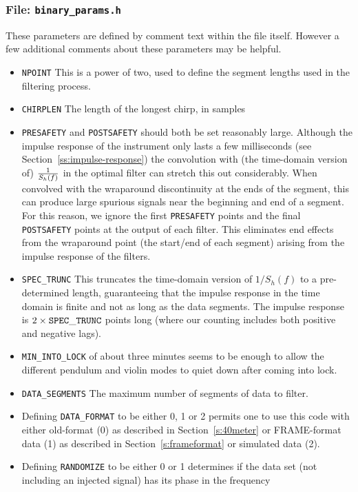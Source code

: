 \subsubsection{File: \texttt{binary\_params.h}}
These parameters are defined by comment text within the file itself.
However a few additional comments about these parameters may be helpful.
\begin{itemize}
\item
{\tt NPOINT}
This is a power of two, used to define the segment lengths used in the
filtering process.
\item
{\tt CHIRPLEN}
The length of the longest chirp, in samples
\item 
{\tt PRESAFETY} and {\tt POSTSAFETY} should both be set reasonably
large.  Although the impulse response of the instrument only lasts a few
milliseconds (see Section~\ref{ss:impulse-response}) the convolution with
(the time-domain version of) ${1 \over S_h(f)}$ in the optimal filter
can stretch this out considerably.  When convolved with the wraparound
discontinuity at the ends of the segment, this can produce large spurious
signals near the beginning and end of a segment.  For this reason, we
ignore the first {\tt PRESAFETY} points and the final {\tt POSTSAFETY}
points at the output of each filter.  This eliminates end effects from
the wraparound point (the start/end of each segment) arising from the
impulse response of the filters.
\item
{\tt SPEC\_TRUNC}
This truncates the time-domain version of $1/S_h(f)$ to a pre-determined
length, guaranteeing that the impulse response in the time domain is
finite and not as long as the data segments.  The impulse response is
$2 \times {\tt SPEC\_TRUNC}$ points long (where our counting includes
both positive and negative lags).
\item
{\tt MIN\_INTO\_LOCK} of about three minutes seems to be enough to
allow the different pendulum and violin modes to quiet down after
coming into lock.
\item
{\tt DATA\_SEGMENTS}
The maximum number of segments of data to filter.
\item
Defining {\tt DATA\_FORMAT} to be either 0, 1 or 2 permits one to use
this code with either old-format (0) as described in Section~\ref{s:40meter}
or FRAME-format data (1) as described in Section~\ref{s:frameformat} or
simulated data (2).
\item
Defining {\tt RANDOMIZE} to be either 0 or 1 determines if the data
set (not including an injected signal) has its phase in the frequency

\end{itemize}

